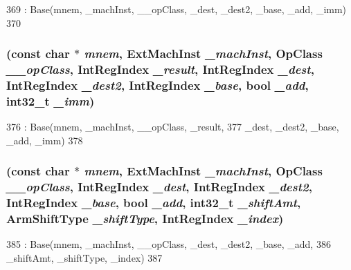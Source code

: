 \begin{DoxyCode}
369         : Base(mnem, _machInst, __opClass, _dest, _dest2, _base, _add, _imm)
370     {}
\end{DoxyCode}
\hypertarget{classArmISA_1_1MemoryOffset_abc78360256aaa85af532182c9b4ee735}{
\subsubsection[{MemoryOffset}]{ (const char $\ast$ {\em mnem}, \/  ExtMachInst {\em \_\-machInst}, \/  OpClass {\em \_\-\_\-opClass}, \/  {\bf IntRegIndex} {\em \_\-result}, \/  {\bf IntRegIndex} {\em \_\-dest}, \/  {\bf IntRegIndex} {\em \_\-dest2}, \/  {\bf IntRegIndex} {\em \_\-base}, \/  bool {\em \_\-add}, \/  int32\_\-t {\em \_\-imm})}}
\label{classArmISA_1_1MemoryOffset_abc78360256aaa85af532182c9b4ee735}



\begin{DoxyCode}
376         : Base(mnem, _machInst, __opClass, _result,
377                 _dest, _dest2, _base, _add, _imm)
378     {}
\end{DoxyCode}
\hypertarget{classArmISA_1_1MemoryOffset_aaca22f89e99b8d6460f5edfb83b33676}{
\subsubsection[{MemoryOffset}]{ (const char $\ast$ {\em mnem}, \/  ExtMachInst {\em \_\-machInst}, \/  OpClass {\em \_\-\_\-opClass}, \/  {\bf IntRegIndex} {\em \_\-dest}, \/  {\bf IntRegIndex} {\em \_\-dest2}, \/  {\bf IntRegIndex} {\em \_\-base}, \/  bool {\em \_\-add}, \/  int32\_\-t {\em \_\-shiftAmt}, \/  {\bf ArmShiftType} {\em \_\-shiftType}, \/  {\bf IntRegIndex} {\em \_\-index})}}
\label{classArmISA_1_1MemoryOffset_aaca22f89e99b8d6460f5edfb83b33676}



\begin{DoxyCode}
385         : Base(mnem, _machInst, __opClass, _dest, _dest2, _base, _add,
386                 _shiftAmt, _shiftType, _index)
387     {}
\end{DoxyCode}


